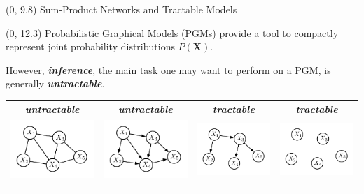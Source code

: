 \documentclass[final]{beamer}
\begin{document}
\begin{frame}{}
  
  \begin{textblock}{80}(0, 9.8)
    Sum-Product Networks and Tractable Models
  \end{textblock}
  
  
  \begin{textblock}{25.2}(0, 12.3)
    \footnotesize
    Probabilistic Graphical Models (PGMs) provide a tool to compactly
    represent joint probability distributions $P(\mathbf{X})$.

    However, \emph{\textbf{inference}}, the main task one may want to perform on a PGM, is generally \emph{\textbf{untractable}}.\bigskip  
    \begin{table}[!ht]
      \setlength{\tabcolsep}{10pt}
      \centering
      \begin{tabular}{c c c c}
        \scriptsize\color{untractable_red}  \textbf{\emph{untractable}} & \scriptsize\color{untractable_red} \textbf{\emph{untractable}}& \scriptsize\color{tractable_green} \emph{\textbf{tractable}} & \scriptsize\color{tractable_green} \emph{\textbf{tractable}}\\

        
        \includegraphics[width=0.22\linewidth]{figures/mrf} &
        \includegraphics[width=0.22\linewidth]{figures/bn} &
        \includegraphics[width=0.22\linewidth]{figures/clt} &
        \includegraphics[width=0.22\linewidth]{figures/nf}\\                                                             
        \addlinespace[-0.2cm]
                                                                            

\end{tabular}
\end{table}
\end{textblock}
\end{frame}
\end{document}
